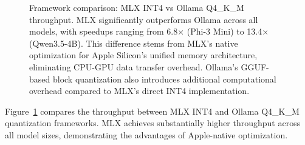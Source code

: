 \documentclass[conference]{IEEEtran}
\begin{document}
\begin{table}[t]
\centering
\caption{Framework comparison: MLX INT4 vs Ollama Q4\_K\_M. Note: Different quantization schemes.}
\label{tab:mlx_memory}
\end{table}

\begin{figure}[t]
\centering
{}
\caption{Framework comparison: MLX INT4 vs Ollama Q4\_K\_M throughput. MLX significantly outperforms Ollama across all models, with speedups ranging from 6.8$\times$ (Phi-3 Mini) to 13.4$\times$ (Qwen3.5-4B). This difference stems from MLX's native optimization for Apple Silicon's unified memory architecture, eliminating CPU-GPU data transfer overhead. Ollama's GGUF-based block quantization also introduces additional computational overhead compared to MLX's direct INT4 implementation.}
\label{fig:mlx_vs_ollama}
\end{figure}

Figure~\ref{fig:mlx_vs_ollama} compares the throughput between MLX INT4 and Ollama Q4\_K\_M quantization frameworks. MLX achieves substantially higher throughput across all model sizes, demonstrating the advantages of Apple-native optimization.
\end{document}
